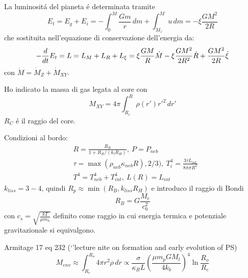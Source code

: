 La luminosit\'a del pianeta \'e determinata tramite
\begin{equation}
E_t=E_g+E_i=-\int_0^M\frac{Gm}{r}\,dm+\int_{M_z}^Mu\,dm=-\xi\frac{GM^2}{2R}
\end{equation}
che sostituita nell'equazione di conservazione dell'energia da:
\begin{equation}
-\frac{d}{d t}E_t=L=L_M+L_R+L_{\xi}=\xi\frac{GM}{R}\dot{M}-\xi\frac{GM^2}{2R^2}\dot{R}+\frac{GM^2}{2R}\dot{\xi}
\end{equation}
con $\dot{M}=\dot{M}_Z+\dot{M}_{XY}$.

Ho indicato la massa di gas legata al core con
\begin{equation}
M_{XY}=4\pi\int_{R_c}^R\rho(r')r'^2\,dr'
\end{equation}
$R_C$ \'e il raggio del core.

Condizioni al bordo:
\begin{align}
&R=\frac{R_B}{1+R_B/(k_lR_H )},\ P=P_{neb}\\
&\tau=\max{(\rho_{neb}\kappa_{neb}R),2/3)},\ T_i^4=\frac{3\tau L_{int}}{8\pi\sigma R^2}\\
&T^4=T_{neb}^4+T_{int}^4,\ L(R)=L_{int}
\end{align}
$k_{liss}=3-4$, quindi $R_p\approx \min{(R_B,k_{liss}R_H)}$ e introduco il raggio di Bondi
\begin{equation}
R_B=G\frac{M_c}{c_0^2}%
\end{equation}
con $c_s=\sqrt{\frac{kT}{\mu m_h}}$
definito come raggio in cui energia termica e potenziale gravitazionale si equivalgono.%

\begin{workout}
\cite{mordasini2014grain}
\end{workout}

\begin{workout}
Armitage 17 eq 232 (`'lecture nite on formation and early evolution of PS)
\begin{equation}
M_{env}\approx\int_{R_c}^{R_o}4\pi r^2\rho\,dr\propto\frac{\sigma}{\kappa_RL}(\frac{\mu m_pGM_t}{4k_b})^4\ln{\frac{R_o}{R_c}}
\end{equation}
\end{workout}

\begin{workout}

\end{workout}


